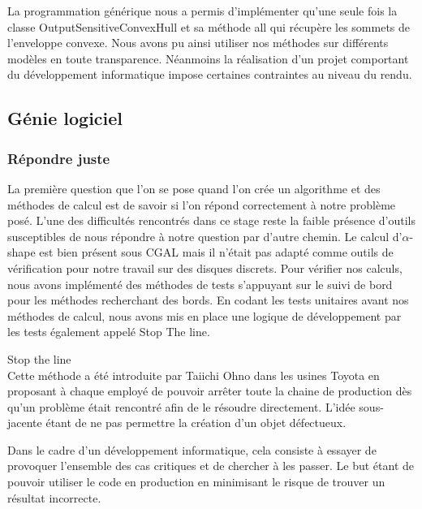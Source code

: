 La programmation générique nous a permis d'implémenter qu'une seule fois la classe OutputSensitiveConvexHull et sa méthode all qui récupère les sommets de l'enveloppe convexe. Nous avons pu ainsi utiliser nos méthodes sur différents modèles en toute transparence. Néanmoins la réalisation d'un projet comportant du développement informatique impose certaines contraintes au niveau du rendu. 

\subsection{Génie logiciel}

\subsubsection{Répondre juste}

La première question que l'on se pose quand l'on crée un algorithme et des méthodes de calcul est de savoir si l'on répond correctement à notre problème posé. L'une des difficultés rencontrés dans ce stage reste la faible présence d'outils susceptibles de nous répondre à notre question par d'autre chemin. Le calcul d'$\alpha$-shape est bien présent sous CGAL mais il n'était pas adapté comme outils de vérification pour notre travail sur des disques discrets. Pour vérifier nos calculs, nous avons implémenté des méthodes de tests s'appuyant sur le suivi de bord pour les méthodes recherchant des bords. En codant les tests unitaires avant nos méthodes de calcul, nous avons mis en place une logique de développement par les tests également appelé Stop The line. \cite{stoptheline}

\begin{Definition}{Stop the line}\\
\label{def:stopthline}
   Cette méthode a été introduite par Taiichi Ohno dans les usines Toyota en proposant à chaque employé de pouvoir arrêter toute la chaine de production dès qu'un problème était rencontré afin de le résoudre directement. L'idée sous-jacente étant de ne pas permettre la création d'un objet défectueux.
\end{Definition}

Dans le cadre d'un développement informatique, cela consiste à essayer de provoquer l'ensemble des cas critiques et de chercher à les passer. Le but étant de pouvoir utiliser le code en production en minimisant le risque de trouver un résultat incorrecte.

